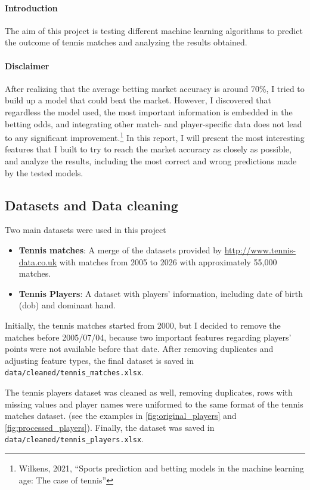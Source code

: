 \paragraph{Introduction} The aim of this project is testing different machine learning algorithms to predict the outcome of tennis matches and analyzing the results obtained.

\paragraph{Disclaimer} After realizing that the average betting market accuracy is around 70\%, I tried to build up a model that could beat the market. However, I discovered that regardless the model used, the most important information is embedded in the betting odds, and integrating other match- and player-specific data does not lead to any significant improvement.\footnote{Wilkens, 2021, ``Sports prediction and betting models in the machine learning age: The case of tennis''}
In this report, I will present the most interesting features that I built to try to reach the market accuracy as closely as possible, and analyze the results, including the most correct and wrong predictions made by the tested models.

\subsection*{Datasets and Data cleaning}

Two main datasets were used in this project

\begin{itemize}
    \item \textbf{Tennis matches}: A merge of the datasets provided by \url{http://www.tennis-data.co.uk} with matches from 2005 to 2026 with approximately 55,000 matches.
    \item \textbf{Tennis Players}: A dataset with players' information, including date of birth (dob) and dominant hand.
\end{itemize}

Initially, the tennis matches started from 2000, but I decided to remove the matches before 2005/07/04, because two important features regarding players' points were not available before that date.
After removing duplicates and adjusting feature types, the final dataset is saved in \texttt{data/cleaned/tennis\_matches.xlsx}.

The tennis players dataset was cleaned as well, removing duplicates, rows with missing values and player names were uniformed to the same format of the tennis matches dataset. (see the examples in \autoref{fig:original_players} and \autoref{fig:processed_players}).
Finally, the dataset was saved in \texttt{data/cleaned/tennis\_players.xlsx}.

